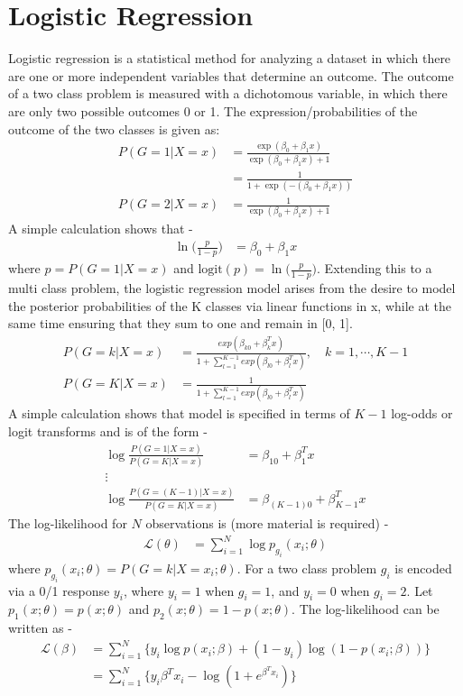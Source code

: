 \documentclass{book}
\begin{document}
\chapter{Logistic Regression}
Logistic regression is a statistical method for analyzing a dataset in which there are one or more independent variables that determine an outcome. The outcome of a two class problem is measured with a dichotomous variable, in which there are only two possible outcomes 0 or 1. The expression/probabilities of the outcome of the two classes is given as:
\begin{align*}
P(G=1|X=x) &= \frac{\exp(\beta_0 + \beta_1{x})}{\exp(\beta_0 + \beta_1{x}) + 1} \\
&= \frac{1}{1 + \exp(-(\beta_0 + \beta_1{x}))} \\
P(G=2|X=x) &= \frac{1}{\exp(\beta_0 + \beta_1{x}) + 1}
\end{align*}
A simple calculation shows that -
\begin{align*}
\ln\Big({\frac{p}{1-p}}\Big) &= \beta_0 + \beta_1{x}
\end{align*}
where $p = P(G=1|X=x)$ and $\mbox{logit}(p) = \ln\Big({\frac{p}{1-p}}\Big)$.
Extending this to a multi class problem, the logistic regression model arises from the desire to model the posterior probabilities of the K classes via linear functions in x, while at the same time ensuring that they sum to one and remain in [0, 1]. 
\begin{align*}
P(G=k|X=x) &= \frac{exp(\beta_{k0}+\beta_k^Tx)}{1+\sum_{l=1}^{K-1}exp(\beta_{l0}+\beta_l^Tx)}, \quad k=1,\cdots,K-1 \\
P(G=K|X=x) &= \frac{1}{1+\sum_{l=1}^{K-1}exp(\beta_{l0}+\beta_l^Tx)}
\end{align*} 
A simple calculation shows that model is specified in terms of $K-1$ log-odds or logit transforms and is of the form -
\begin{align*}
\log \frac{P(G=1|X=x)}{P(G=K|X=x)} &= \beta_{10} + \beta_1^Tx \\
 \vdots \\
\log \frac{P(G=(K-1)|X=x)}{P(G=K|X=x)} &= \beta_{(K-1)0} + \beta_{K-1}^Tx 
\end{align*}
The log-likelihood for $N$ observations is (more material is required) -
\begin{align*}
\mathcal{L}(\theta) &= \sum_{i=1}^{N} \log p_{g_i} (x_i;\theta) 
\end{align*}
where $p_{g_i} (x_i;\theta)=P(G=k|X=x_i;\theta)$.
For a two class problem $g_i$ is encoded via a 0/1 response $y_i$, where $y_i=1$ when $g_i=1$, and $y_i=0$ when $g_i=2$. 
Let $p_1(x;\theta)=p(x;\theta)$ and $p_2(x;\theta)=1-p(x;\theta)$. The log-likelihood can be written as -
\begin{align*}
\mathcal{L}(\beta) &= \sum_{i=1}^{N} \Big\{ y_i \log p (x_i;\beta) + (1-y_i) \log (1-p (x_i;\beta))  \Big\} \\
&= \sum_{i=1}^{N} \Big\{ y_i \beta^T x_i - \log (1+e^{\beta^Tx_i}) \Big\}
\end{align*}
\end{document}
